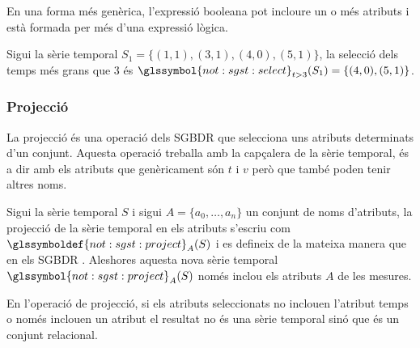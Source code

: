 En una forma més genèrica, l'expressió booleana pot incloure un o més
atributs i està formada per més d'una expressió lògica.


\begin{example}
  Sigui la sèrie temporal $S_1=\{(1,1),(3,1),(4,0),(5,1)\}$, la
  selecció dels temps més grans que $3$ és
  $\glssymbol{not:sgst:select}_{t>3}(S_1) = \{(4,0),(5,1)\}$.
\end{example}





\subsubsection{Projecció}


La projecció és una operació dels \gls{SGBDR} que selecciona uns
atributs determinats d'un conjunt. Aquesta operació treballa amb la
capçalera de la sèrie temporal, és a dir amb els atributs que
genèricament són $t$ i $v$ però que també poden tenir altres noms.

\begin{definition}[Projecció]
  Sigui la sèrie temporal $S$ i sigui $A=\{a_0,
  \dotsc, a_n\}$ un conjunt de noms d'atributs, la projecció de la
  sèrie temporal en els atributs s'escriu com
  $\glssymboldef{not:sgst:project}_A(S)$ i es defineix de la mateixa
  manera que en els
  \gls{SGBDR} \parencite[cap.~7]{date04:introduction8}. Aleshores
  aquesta nova sèrie temporal $\glssymbol{not:sgst:project}_A(S)$
  només inclou els atributs $A$ de les mesures.
\end{definition}

En l'operació de projecció, si els
atributs seleccionats no inclouen l'atribut temps o només inclouen
un atribut el resultat no és una sèrie temporal sinó que és un conjunt
relacional. 






